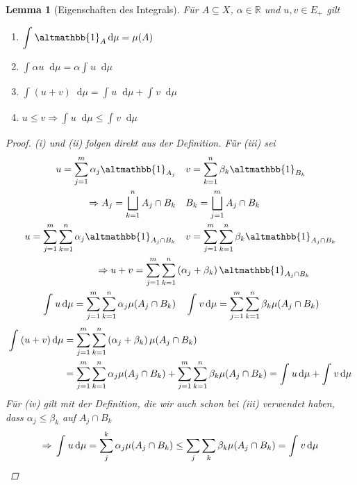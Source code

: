 \documentclass[11pt, twoside, a4paper]{article}
\theoremstyle{plain}
\newtheorem{lemma}[blockelement]{Lemma}
\numberwithin{equation}{subsection}
\newcommand{\pair}[1]{\left(#1\right)}
\newcommand{\of}[1]{\mathopen{}\mathclose{}\bgroup\left(#1\aftergroup\egroup\right)}
\newcommand{\impl}[0]{\Rightarrow{}}
\newcommand{\dif}{\mathop{}\!\mathrm{d}}
\newcommand{\dsty}{\displaystyle}
\newcommand{\charfunc}{\altmathbb{1}}
\newcommand{\R}{\mathbb{R}}
\begin{document}
    \begin{lemma}[Eigenschaften des Integrals]
        Für $A\subseteq X$, $\alpha\in\R$ und $u,v\in E_+$ gilt
        \begin{enumerate}[label=(\roman*)]
            \item $\dsty \int_{}^{} \charfunc_{A} \dif \mu = \mu\of{A}$
            \item $\dsty \int_{}^{} \alpha u \dif \mu = \alpha \int_{}^{} u \dif \mu$
            \item $\dsty \int_{}^{} \pair{u + v} \dif \mu = \int_{}^{} u \dif \mu + \int_{}^{} v \dif \mu$
            \item $u\leq v \impl \dsty \int_{}^{} u \dif \mu \leq \int_{}^{} v \dif \mu$
        \end{enumerate}
        \begin{proof}
        (i)
            und (ii) folgen direkt aus der Definition. Für (iii) sei
            \begin{align*}
                u = \sum_{j=1}^{m} \alpha_j \charfunc_{A_j} &\quad v = \sum_{k=1}^{n} \beta_k \charfunc_{B_k}\\
                \impl A_j = \bigsqcup_{k=1}^n A_j \cap B_k &\quad B_k = \bigsqcup_{j=1}^m A_j \cap B_k\\
                u = \sum_{j=1}^{m} \sum_{k=1}^{n} \alpha_j \charfunc_{A_j \cap B_k} &\quad v = \sum_{j=1}^{m} \sum_{k=1}^{n} \beta_k \charfunc_{A_j \cap B_k}\\
                \impl u +v = \sum_{j=1}^{m} \sum_{k=1}^{n} &\pair{\alpha_j + \beta_k} \charfunc_{A_j \cap B_k}\\
                \int_{}^{} u \dif \mu = \sum_{j=1}^{m} \sum_{k=1}^{n} \alpha_j \mu\of{A_j \cap B_k} &\quad \int_{}^{} v \dif \mu = \sum_{j=1}^{m} \sum_{k=1}^{n} \beta_k \mu\of{A_j \cap B_k}
            \end{align*}
            \begin{align*}
                \int_{}^{} \pair{u+v} \dif \mu &= \sum_{j=1}^{m} \sum_{k=1}^{n} \pair{\alpha_j + \beta_k} \mu\of{A_j \cap B_k}\\
                &= \sum_{j=1}^{m} \sum_{k=1}^{n} \alpha_j \mu\of{A_j \cap B_k} + \sum_{j=1}^{m} \sum_{k=1}^{n} \beta_k \mu\of{A_j \cap B_k} = \int_{}^{} u \dif \mu + \int_{}^{} v \dif \mu
            \end{align*}
            Für (iv) gilt mit der Definition, die wir auch schon bei (iii) verwendet haben, dass $\alpha_j \leq \beta_k$ auf $A_j \cap B_k$
            \begin{align*}
                \impl \int_{}^{} u \dif \mu = \sum_{j}^{k} \alpha_j \mu\of{A_j \cap B_k} \leq \sum_{j}^{} \sum_{k}^{} \beta_k \mu\of{A_j \cap B_k} = \int_{}^{} v \dif \mu\qedhere
            \end{align*}
        \end{proof}
    \end{lemma}
\end{document}

